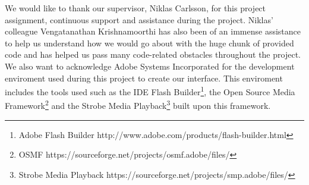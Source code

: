 We would like to thank our supervisor, Niklas Carlsson, for this project assignment, continuous support and assistance during the project. Niklas’ colleague Vengatanathan Krishnamoorthi has also been of an immense assistance to help us understand how we would go about with the huge chunk of provided code and has helped us pass many code-related obstacles throughout the project. 
We also want to acknowledge Adobe Systems Incorporated for the development enviroment used during this project to create our interface. This enviroment includes the tools used such as the IDE Flash Builder\footnote{Adobe Flash Builder http://www.adobe.com/products/flash-builder.html}, the Open Source Media Framework\footnote{OSMF https://sourceforge.net/projects/osmf.adobe/files/} and the Strobe Media Playback\footnote{Strobe Media Playback https://sourceforge.net/projects/smp.adobe/files/} built upon this framework.
